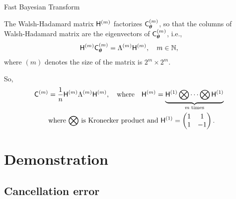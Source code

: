 \documentclass[handout, 10pt,compress,xcolor={usenames,dvipsnames}]{beamer} %
\newcommand{\bm}[1]{\boldsymbol{#1}}
\renewcommand{\mLambda}{\Lambda}
\renewcommand{\vtheta}{{\bm{\theta}}}
\begin{document}
\begin{frame}{Fast Bayesian Transform}
	
	
		The Walsh-Hadamard matrix $\mathsf{H}^{(m)}$ factorizes $\mC_{\vtheta}^{(m)}$, so that the columns of Walsh-Hadamard matrix are the eigenvectors of $\mC_{\vtheta}^{(m)}$, i.e.,
		\vspace{-2ex}
		\begin{align*}
		\mH^{(m)} \mC_{\vtheta}^{(m)}  = \mLambda^{(m)} \mH^{(m)}, \quad m \in \naturals, 
		\end{align*}
		where $(m)$ denotes the size of the matrix is $2^m \times 2^m$.
	
	So,
	\begin{align*}
	\mC^{(m)} &= \frac{1}{n} \mH^{(m)} \mLambda^{(m)} \mH^{(m)}, \quad \text{where} \quad \mH^{({m})} = \underbrace{ \mH^{(1)} \bigotimes \cdots \bigotimes \mH^{(1)} }_{m \; \text{times}}
	\\ 
	& \text{where $\bigotimes$ is Kronecker product and }
	\mH^{(1)} =
	\begin{pmatrix}
	1 & 1 \\ 1 & -1
	\end{pmatrix}.
	\end{align*}
\end{frame}










\section{Demonstration}
















\subsection{Cancellation error}
\end{document}
